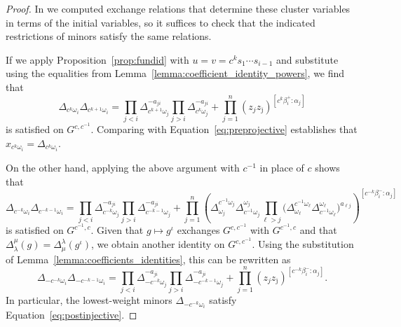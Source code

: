 \documentclass[12pt]{amsart}
\newcommand{\ol}[1]{\overline{#1}}
\theoremstyle{remark}
\numberwithin{equation}{section}
\numberwithin{figure}{section}
\begin{document}
\begin{proof}
  In  we computed exchange relations that determine these cluster variables in terms of the initial variables, so it suffices to check that the indicated restrictions of minors satisfy the same relations.

  If we apply Proposition~\ref{prop:fundid} with $u = v = c^k s_1 \cdots s_{i-1}$ and substitute using the equalities from Lemma~\ref{lemma:coefficient_identity_powers}, we find that 
  \begin{equation}
    \Delta_{c^k\omega_i}\Delta_{c^{k+1}\omega_i} 
    = 
    \prod_{j<i}\Delta_{c^{k+1}\omega_j}^{-a_{ji}}
    \prod_{j>i}\Delta_{c^k\omega_j}^{-a_{ji}}
    +
    \prod_{j=1}^n(z_j z_{\ol{\jmath}})^{[c^k\beta_i^+:\alpha_j]}
  \end{equation}
  is satisfied on $G^{c,c^{-1}}$.
  Comparing with Equation~\ref{eq:preprojective} establishes that $x_{c^k\omega_i} = \Delta_{c^k \omega_i}$.
  
  On the other hand, applying the above argument with $c^{-1}$ in place of $c$ shows that  
  \begin{equation*} \Delta_{c^{-k}\omega_i} \Delta_{c^{-k-1}\omega_i} = 
    \prod_{j<i}\Delta_{c^{-k}\omega_j}^{-a_{ji}}
    \prod_{j>i}\Delta_{c^{-k-1}\omega_j}^{-a_{ji}}
    +
    \prod_{j=1}^n\left( 
      \Delta^{c^{-1} \omega_j}_{\omega_j}
      \Delta^{\omega_j}_{ c^{-1}\omega_j} 
      \prod_{\ell>j}\big(
        \Delta^{c^{-1} \omega_\ell}_{\omega_\ell} 
        \Delta^{\omega_\ell}_{c^{-1} \omega_\ell}
      \big)^{a_{\ell j}}
    \right)^{[c^{-k}\beta_i^-:\alpha_j]}
  \end{equation*}
  is satisfied on $G^{c^{-1},c}$.
  Given that $g \mapsto g^\iota$ exchanges $G^{c,c^{-1}}$ with $G^{c^{-1},c}$ and that $\Delta_\lambda^\mu(g) = \Delta_\mu^\lambda(g^\iota)$, we obtain another identity on $G^{c,c^{-1}}$.
  Using the substitution of Lemma~\ref{lemma:coefficients_identities}, this can be rewritten as
  \begin{equation}
  \Delta_{-c^{-k}\omega_i}\Delta_{-c^{-k-1}\omega_i} =
    \prod_{j<i}\Delta_{-c^{-k}\omega_j}^{-a_{ji}}
    \prod_{j>i}\Delta_{-c^{-k-1}\omega_j}^{-a_{ji}}
    +
    \prod_{j=1}^n (z_j z_{\ol{\jmath}})^{[c^{-k}\beta_i^-:\alpha_j]}.
  \end{equation}
  In particular, the lowest-weight minors $\Delta_{-c^{-k}\omega_i}$ satisfy Equation~\ref{eq:postinjective}.
  

\end{proof}
\end{document}
